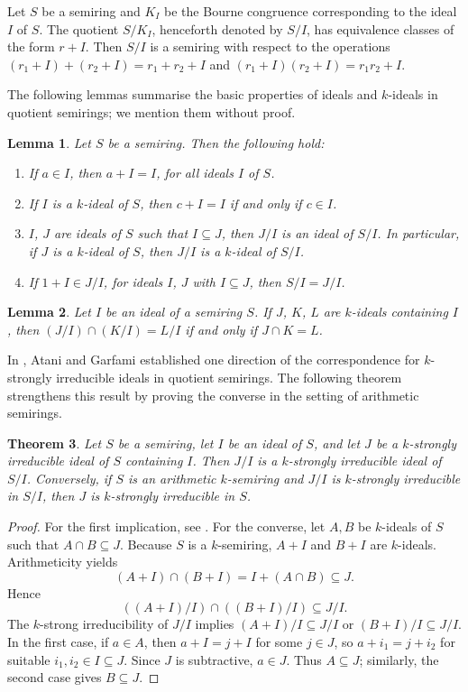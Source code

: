 \documentclass[11pt,leqno]{amsart}
\newtheorem{theorem}{Theorem}[section]
\newtheorem{lemma}[theorem]{Lemma}
\theoremstyle{definition}
\numberwithin{equation}{section}
\begin{document}
    Let $S$ be a semiring and $K_I$ be the Bourne congruence corresponding to the ideal $I$ of $S$. The quotient $S/K_I$, henceforth denoted by $S/I$, has equivalence classes of the form $r+I$. Then $S/I$ is a semiring with respect to the operations $(r_1+I)+(r_2+I)=r_1+r_2+I$ and $(r_1+I)(r_2+I)=r_1r_2+I$. 


The following lemmas summarise the basic properties of ideals and $k$-ideals in quotient semirings; we mention them without proof.

\begin{lemma}\label{loc12}
    Let $S$ be a semiring. Then the following hold:
    \begin{enumerate}
        \item If $a\in I$, then $a+I=I$, for all ideals $I$ of $S$.
        \item If $I$ is a $k$-ideal of $S$, then $c+I=I$ if and only if $c \in I$.
        \item $I$, $J$ are ideals of $S$ such that $I\subseteq J$, then $J/I$ is an ideal of $S/I$. In particular, if $J$ is a $k$-ideal of $S$, then $J/I$ is a $k$-ideal of $S/I$.
        \item If $1+I\in J/I$, for ideals $I$, $J$ with $I \subseteq J$, then $S/I =J/I$.
    \end{enumerate}
\end{lemma}

\begin{lemma}\label{loc13}
    Let $I$ be an ideal of a semiring $S$. If $J$, $K$, $L$ are $k$-ideals containing $I$, then $(J/I)\cap (K/I)=L/I$ if and only if $J\cap K=L$.
\end{lemma}

In \cite[Theorem 2.7]{AtaniGarfami13}, Atani and Garfami established one direction of the correspondence for $k$-strongly irreducible ideals in quotient semirings. The following theorem strengthens this result by proving the converse in the setting of arithmetic semirings.
\begin{theorem}\label{k-strongly irreducible ideals in quotient semirings}
    Let $S$ be a semiring, let $I$ be an ideal of $S$, and let $J$ be a $k$-strongly irreducible ideal of $S$ containing $I$. Then $J/I$ is a $k$-strongly irreducible ideal of $S/I$. Conversely, if $S$ is an arithmetic $k$-semiring and $J/I$ is $k$-strongly irreducible in $S/I$, then $J$ is $k$-strongly irreducible in $S$.
\end{theorem}

\begin{proof}
    For the first implication, see \cite[Theorem 2.7]{AtaniGarfami13}. For the converse, let $A,B$ be $k$-ideals of $S$ such that $A\cap B\subseteq J$. Because $S$ is a $k$-semiring, $A+I$ and $B+I$ are $k$-ideals. Arithmeticity yields
\[
(A+I)\cap(B+I)=I+(A\cap B)\subseteq J.
\]
Hence
\[
((A+I)/I)\cap((B+I)/I)\subseteq J/I.
\]
The $k$-strong irreducibility of $J/I$ implies $(A+I)/I\subseteq J/I$ or $(B+I)/I\subseteq J/I$. In the first case, if $a\in A$, then $a+I=j+I$ for some $j\in J$, so $a+i_1=j+i_2$ for suitable $i_1,i_2\in I\subseteq J$. Since $J$ is subtractive, $a\in J$. Thus $A\subseteq J$; similarly, the second case gives $B\subseteq J$.
\end{proof}
\end{document}
